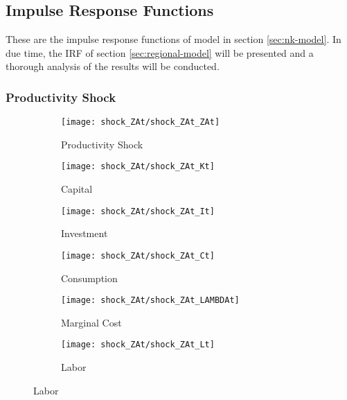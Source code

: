 \documentclass[
thesis.tex
]{subfiles}
\begin{document}
	
	\newpage
	
\subsection{Impulse Response Functions}

These are the impulse response functions of model in section \ref{sec:nk-model}. In due time, the IRF of section \ref{sec:regional-model} will be presented and a thorough analysis of the results will be conducted.

\subsubsection{Productivity Shock}

\begin{figure}[h!]
	\centering
	\begin{subfigure}[b]{0.3\textwidth}
		\centering
		\texttt{[image: shock\_ZAt/shock\_ZAt\_ZAt]}
		\caption{Productivity Shock}
		\label{fig:zat-productivity-shock}
	\end{subfigure}
	\hfill
	\begin{subfigure}[b]{0.3\textwidth}
		\centering
		\texttt{[image: shock\_ZAt/shock\_ZAt\_Kt]}
		\caption{Capital}
		\label{fig:zat-capital}
	\end{subfigure}
	\hfill
	\begin{subfigure}[b]{0.3\textwidth}
		\centering
		\texttt{[image: shock\_ZAt/shock\_ZAt\_It]}
		\caption{Investment}
		\label{fig:zat-investment}
	\end{subfigure}
	\hfill
	
	\vspace*{0.5cm}
	
	\begin{subfigure}[b]{0.3\textwidth}
		\centering
		\texttt{[image: shock\_ZAt/shock\_ZAt\_Ct]}
		\caption{Consumption}
		\label{fig:zat-consumption}
	\end{subfigure}
	\hfill
	\begin{subfigure}[b]{0.3\textwidth}
		\centering
		\texttt{[image: shock\_ZAt/shock\_ZAt\_LAMBDAt]}
		\caption{Marginal Cost}
		\label{fig:zat-marginal-cost}
	\end{subfigure}
	\hfill
	\begin{subfigure}[b]{0.3\textwidth}
		\centering
		\texttt{[image: shock\_ZAt/shock\_ZAt\_Lt]}
		\caption{Labor}
		\label{fig:zat-labor}
	\end{subfigure}
	\hfill
	

\end{figure}
\end{document}
